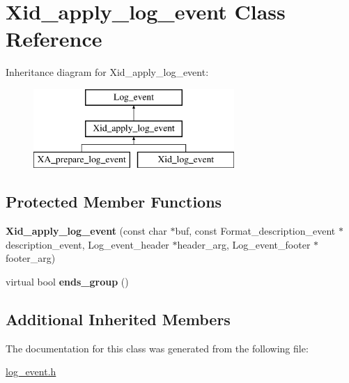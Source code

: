 \hypertarget{classXid__apply__log__event}{}\section{Xid\+\_\+apply\+\_\+log\+\_\+event Class Reference}
\label{classXid__apply__log__event}
Inheritance diagram for Xid\+\_\+apply\+\_\+log\+\_\+event\+:\begin{figure}[H]
\begin{center}
\leavevmode
\includegraphics[height=3.000000cm]{classXid__apply__log__event}
\end{center}
\end{figure}
\subsection*{Protected Member Functions}
\begin{DoxyCompactItemize}
\item 
\mbox{\label{classXid__apply__log__event_a13beacbfbd179a250718251bf79bf0d9}} 
{\bfseries Xid\+\_\+apply\+\_\+log\+\_\+event} (const char $\ast$buf, const Format\+\_\+description\+\_\+event $\ast$description\+\_\+event, Log\+\_\+event\+\_\+header $\ast$header\+\_\+arg, Log\+\_\+event\+\_\+footer $\ast$footer\+\_\+arg)
\item 
\mbox{\label{classXid__apply__log__event_a6441d1c5f0e15f9b7045500b17930cdc}} 
virtual bool {\bfseries ends\+\_\+group} ()
\end{DoxyCompactItemize}
\subsection*{Additional Inherited Members}


The documentation for this class was generated from the following file\+:\begin{DoxyCompactItemize}
\item 
\mbox{\hyperlink{log__event_8h}{log\+\_\+event.\+h}}\end{DoxyCompactItemize}
